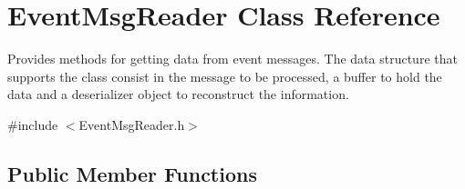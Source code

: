 \hypertarget{class_event_msg_reader}{\section{Event\-Msg\-Reader Class Reference}
\label{class_event_msg_reader}
}


Provides methods for getting data from event messages. The data structure that supports the class consist in the message to be processed, a buffer to hold the data and a deserializer object to reconstruct the information.  




{\ttfamily \#include $<$Event\-Msg\-Reader.\-h$>$}

\subsection*{Public Member Functions}
